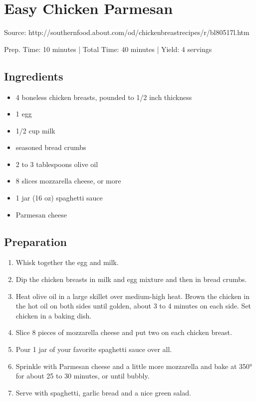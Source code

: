 \section{Easy Chicken Parmesan}

Source: http://southernfood.about.com/od/chickenbreastrecipes/r/bl80517l.htm

\begin{center}
\noindent Prep. Time: 10 minutes |
Total Time: 40 minutes | 
Yield: 4 servings
\end{center}

\subsection{Ingredients}
\begin{itemize}
    \item 4 boneless chicken breasts, pounded to 1/2 inch thickness
    \item 1 egg
    \item 1/2 cup milk
    \item seasoned bread crumbs
    \item 2 to 3 tablespoons olive oil
    \item 8 slices mozzarella cheese, or more
    \item 1 jar (16 oz) spaghetti sauce
    \item Parmesan cheese
\end{itemize}

\subsection{Preparation}
\begin{enumerate}
    \item Whisk together the egg and milk. 
    \item Dip the chicken breasts in milk and egg mixture and then in bread crumbs.
    \item Heat olive oil in a large skillet over medium-high heat. Brown the chicken in the hot oil on both sides until golden, about 3 to 4 minutes on each side. Set chicken in a baking dish.
    \item Slice 8 pieces of mozzarella cheese and put two on each chicken breast.
    \item Pour 1 jar of your favorite spaghetti sauce over all.
    \item Sprinkle with Parmesan cheese and a little more mozzarella and bake at 350° for about 25 to 30 minutes, or until bubbly.
    \item Serve with spaghetti, garlic bread and a nice green salad.
\end{enumerate}
